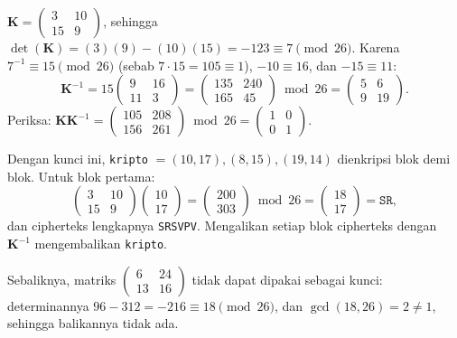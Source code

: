 \begin{contoh}
$\mathbf{K} = \begin{pmatrix} 3 & 10 \\ 15 & 9 \end{pmatrix}$, sehingga $\det(\mathbf{K}) = (3)(9) - (10)(15) = -123 \equiv 7 \pmod{26}$. Karena $7^{-1} \equiv 15 \pmod{26}$ (sebab $7 \cdot 15 = 105 \equiv 1$), $-10 \equiv 16$, dan $-15 \equiv 11$:
\[
\mathbf{K}^{-1} = 15 \begin{pmatrix} 9 & 16 \\ 11 & 3 \end{pmatrix}
= \begin{pmatrix} 135 & 240 \\ 165 & 45 \end{pmatrix} \bmod 26
= \begin{pmatrix} 5 & 6 \\ 9 & 19 \end{pmatrix}.
\]
Periksa: $\mathbf{K}\mathbf{K}^{-1} = \begin{pmatrix} 105 & 208 \\ 156 & 261 \end{pmatrix} \bmod 26 = \begin{pmatrix} 1 & 0 \\ 0 & 1 \end{pmatrix}$.

Dengan kunci ini, \texttt{kripto} $= (10, 17), (8, 15), (19, 14)$ dienkripsi blok demi blok. Untuk blok pertama:
\[
\begin{pmatrix} 3 & 10 \\ 15 & 9 \end{pmatrix}\begin{pmatrix} 10 \\ 17 \end{pmatrix}
= \begin{pmatrix} 200 \\ 303 \end{pmatrix} \bmod 26 = \begin{pmatrix} 18 \\ 17 \end{pmatrix} = \texttt{SR},
\]
dan cipherteks lengkapnya \texttt{SRSVPV}. Mengalikan setiap blok cipherteks dengan $\mathbf{K}^{-1}$ mengembalikan \texttt{kripto}.
\end{contoh}

Sebaliknya, matriks $\begin{pmatrix} 6 & 24 \\ 13 & 16 \end{pmatrix}$ tidak dapat dipakai sebagai kunci: determinannya $96 - 312 = -216 \equiv 18 \pmod{26}$, dan $\gcd(18, 26) = 2 \neq 1$, sehingga balikannya tidak ada.

